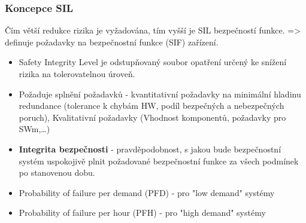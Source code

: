\subsubsection*{Koncepce SIL}
Čím větší redukce rizika je vyžadována, tím vyšší je SIL bezpečností funkce. => definuje požadavky na bezpečnostní funkce (SIF) zařízení.
\begin{itemize}
  \item Safety Integrity Level je odstupňovaný soubor opatření určený ke snížení rizika na tolerovatelnou úroveň.
  \item Požaduje splnění požadavků - kvantitativní požadavky na minimální hladinu redundance (tolerance k chybám HW, podíl bezpečných a nebezpečných poruch), Kvalitativní požadavky (Vhodnost komponentů, požadavky pro SWm,\dots)
  \item \textbf{Integrita bezpečnosti} - pravděpodobnost, s jakou bude bezpečnostní systém uspokojivě plnit požadované bezpečnostní funkce za všech podmínek po stanovenou dobu.
  \item Probability of failure per demand (PFD) - pro "low demand" systémy
  \item Probability of failure per hour (PFH) - pro "high demand" systémy
\end{itemize}

